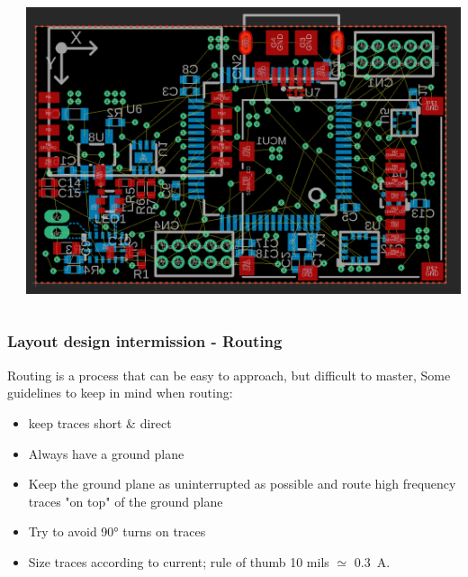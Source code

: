 \documentclass[11pt,xcolor=table,aspectratio=169]{beamer}
\begin{document}
\begin{frame}
{\begin{columns}
\begin{column}{.5\textwidth}
\begin{adjustbox}{max height=.8\textheight}
				\end{adjustbox}	
			\end{column}
			\begin{column}{.5\textwidth}
				\begin{adjustbox}{max height=.8\textheight}
					\includegraphics[width=\textwidth]{media/post_placement.png}
				\end{adjustbox}
			\end{column}
		\end{columns}
	}	
	\end{frame}

	\begin{frame}
		\frametitle{Layout design intermission - Routing}
		Routing is a process that can be easy to approach, but difficult to master, Some guidelines to keep in mind when routing:
		\begin{itemize}
			\item keep traces short \& direct
			\item Always have a ground plane
			\item Keep the ground plane as uninterrupted as possible and route high frequency traces "on top" of the ground plane
			\item Try to avoid 90° turns on traces
			\item Size traces according to current; rule of thumb 10 mils $\simeq$ \SI{0.3}{A}.
		\end{itemize}
	\end{frame}
\end{document}
